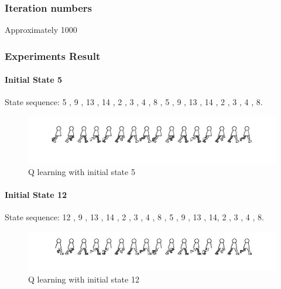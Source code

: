 \documentclass{article}
\begin{document}
\subsubsection{Iteration numbers}
Approximately 1000
\newpage
\subsubsection{Experiments Result}
\paragraph{Initial State 5}
State sequence:	
 5   ,  9  ,  13   , 14   ,  2 ,    3  ,   4   ,  8  ,   5  ,   9  ,  13  ,  14  ,   2  ,   3   ,  4 ,    8.
\begin{figure}[ht]
	\centering
	\includegraphics[width=1\linewidth]{Q_5.jpg} 
	\caption{Q learning with initial state 5}  	
\end{figure}
\paragraph{Initial State 12}
State sequence:	12   ,  9  ,  13 ,   14   ,  2   ,  3   ,  4  ,   8  ,   5  ,   9  ,  13 ,   14,     2  ,   3   ,  4   ,  8.
\begin{figure}[ht]
	\centering
	\includegraphics[width=1\linewidth]{Q_12.jpg} 
	\caption{Q learning with initial state 12}  	
\end{figure}
\end{document}
